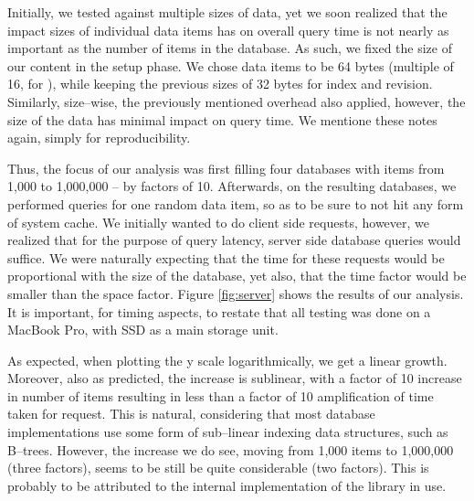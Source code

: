Initially, we tested against multiple sizes of data, yet we soon realized that the impact sizes of individual data items has on overall query time is not nearly as important as the number of items in the database.
As such, we fixed the size of our content in the setup phase.
We chose data items to be 64 bytes (multiple of 16, for ), while keeping the previous sizes of 32 bytes for index and revision.
Similarly, size--wise, the previously mentioned overhead also applied, however, the size of the data has minimal impact on query time.
We mentione these notes again, simply for reproducibility.

Thus, the focus of our analysis was first filling four databases with items from 1,000 to 1,000,000 -- by factors of 10.
Afterwards, on the resulting databases, we performed queries for one random data item, so as to be sure to not hit any form of system cache.
We initially wanted to do client side  requests, however, we realized that for the purpose of query latency, server side database queries would suffice.
We were naturally expecting that the time for these requests would be proportional with the size of the database, yet also, that the time factor would be smaller than the space factor.
Figure \ref{fig:server} shows the results of our analysis.
It is important, for timing aspects, to restate that all testing was done on a MacBook Pro, with SSD as a main storage unit.


As expected, when plotting the y scale logarithmically, we get a linear growth.
Moreover, also as predicted, the increase is sublinear, with a factor of 10 increase in number of items resulting in less than a factor of 10 amplification of time taken for request.
This is natural, considering that most database implementations use some form of sub--linear indexing data structures, such as B--trees.
However, the increase we do see, moving from 1,000 items to 1,000,000 (three factors), seems to be still be quite considerable (two factors).
This is probably to be attributed to the internal implementation of the library in use.

